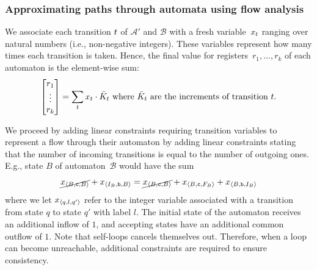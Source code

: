 \subsubsection{Approximating paths through automata using flow analysis}\label{sec:a_1}

We associate each transition $t$ of $\mathcal{A}'$ and $\mathcal{B}$ with a fresh
variable~$x_t$ ranging over natural numbers (i.e.,
non-negative integers).
These variables represent how many times each
transition is taken. Hence, the final value for registers~$r_1, \ldots,
r_k$ of each automaton is the element-wise sum:
\begin{equation}\label{eq:counter-sums}
\begin{bmatrix} 
  r_1 \\
  \vdots\\
  r_k \\
\end{bmatrix} = \sum_t x_t \cdot 
  \bar{K}_t \text{ where $\bar{K}_t$ are the increments of transition $t$}.
\end{equation}

We proceed by adding linear constraints requiring transition variables to
represent a flow through their automaton by adding linear constraints stating
that the number of incoming transitions is equal to the number of outgoing ones.
E.g., state $B$ of automaton~$\mathcal{B}$ would have the sum
%
\begin{equation}\label{eq:flow-eqs}
  \cancel{x_{\left\langle B, \texttt{c}, B\right\rangle}} +
  x_{\left\langle I_B, \texttt{b}, B\right\rangle} = \cancel{x_{\left\langle B, \texttt{c}, B\right\rangle}}  +
  x_{\left\langle B, \texttt{c}, F_B\right\rangle} + x_{\left\langle B, \texttt{b}, I_B\right\rangle}
\end{equation}
%
where we let
$x_{\left\langle q, l, q'\right\rangle}$ refer to the integer variable associated with a
transition from state $q$ to state $q'$ with label $l$. The initial state
of the automaton receives an additional inflow of $1$, and accepting
states have an additional common outflow of $1$. Note that self-loops
cancels themselves out. Therefore, when a loop can become
unreachable, additional constraints are required to ensure consistency.


